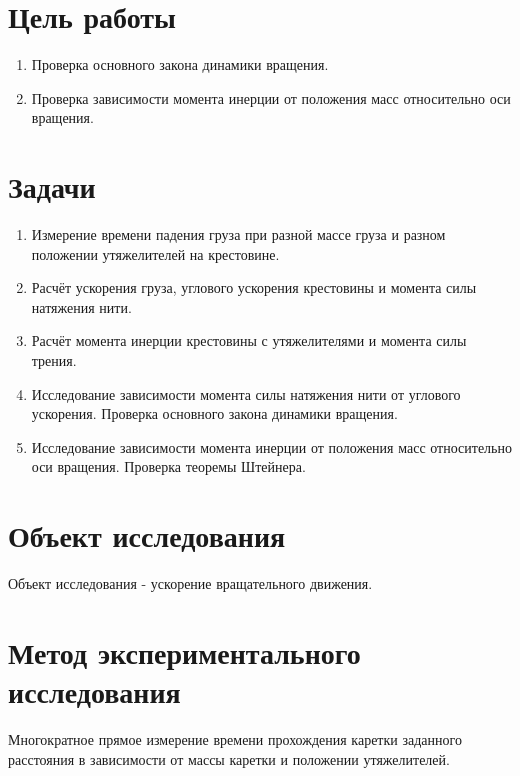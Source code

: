 \section{Цель работы}
\begin{enumerate}
    \item Проверка основного закона динамики вращения.
    \item Проверка зависимости момента инерции от положения масс относительно оси вращения.
\end{enumerate}

\section{Задачи}
\begin{enumerate}
    \item Измерение времени падения груза при разной массе груза и разном положении утяжелителей на крестовине.
    \item Расчёт ускорения груза, углового ускорения крестовины и момента силы натяжения нити.
    \item Расчёт момента инерции крестовины с утяжелителями и момента силы трения.
    \item Исследование зависимости момента силы натяжения нити от углового ускорения. Проверка основного закона динамики вращения.
    \item Исследование зависимости момента инерции от положения масс
    относительно оси вращения. Проверка теоремы Штейнера.
\end{enumerate}

\section{Объект исследования}
Объект исследования - ускорение вращательного движения.

\section{Метод экспериментального исследования}
Многократное прямое измерение времени прохождения каретки заданного расстояния
в зависимости от массы каретки и положении утяжелителей.

